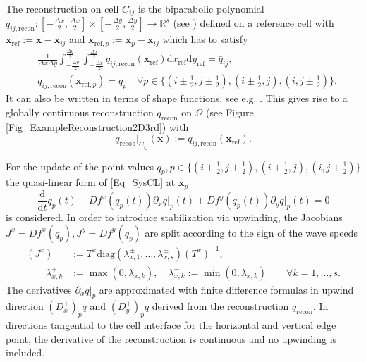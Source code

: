 \documentclass[12pt,a4paper]{article}
\newcommand{\refel}{\mathrm{ref}}
\newcommand{\recon}{\mathrm{recon}}
\begin{document}
The reconstruction on cell \(C_{ij}\) is the biparabolic polynomial \(q_{ij, \mathrm{recon}}: [-\tfrac{\Delta x}{2}, \tfrac{\Delta x}{2}]\times[-\tfrac{\Delta y}{2},\tfrac{\Delta y}{2}] \rightarrow \mathbb R^s\) (see \cite{ABK2025, BHKR2019}) 
defined on a reference cell with \(\mathbf x_\mathrm{ref} := \mathbf x - \mathbf x_{ij}\) and \(\mathbf x_{\mathrm{ref},p} := \mathbf x_p - \mathbf x_{ij}\) which has to satisfy
\begin{align*}
	&\frac{1}{\Delta x \Delta y} \int_{-\frac{\Delta y}{2}}^{\frac{\Delta y}{2}}\int_{-\frac{\Delta x}{2}}^{\frac{\Delta x}{2}} q_{ij, \mathrm{recon}}(\mathbf x_\mathrm{ref}) \mathrm d x_\mathrm{ref} \mathrm d y_\mathrm{ref} = \bar q_{ij},\\
	&q_{ij, \mathrm{recon}}(\mathbf x_{\mathrm{ref},p}) = q_p \quad \forall p \in \{(i \pm \tfrac12, j\pm \tfrac12), (i \pm \tfrac12,j), (i,j \pm \tfrac12)\}.
\end{align*}
It can also be written in terms of shape functions, see e.g. \cite{BKKL2024pre}. This gives rise to a globally continuous reconstruction \(q_\mathrm{recon}\) on \(\Omega\) (see Figure \ref{Fig_ExampleReconstruction2D3rd}) with 
\begin{equation}
	q_\recon|_{C_{ij}}(\mathbf x) := q_{ij, \recon}(\mathbf x_\refel).
\end{equation}



For the update of the point values \(q_p, p \in \{(i+\tfrac{1}{2},j+\tfrac{1}{2}), (i+\tfrac{1}{2},j), (i,j+\tfrac{1}{2})\}\) the quasi-linear form of \eqref{Eq_SysCL} at $\mathbf x_p$
\begin{equation*}
	\frac{\mathrm d}{\mathrm d t}q_p(t)  +  Df^x(q_p(t)) \partial_x q\vert_p(t) +  Df^y(q_p(t)) \partial_y q\vert_p(t)  = 0 
\end{equation*}
is considered.
In order to introduce stabilization via upwinding, the Jacobians \(J^x = Df^x(q_p), J^y = Df^y(q_p) \) are split according to the sign of the wave speeds
\begin{align*}
	(J^x)^{\pm} &:= T^x\mathrm{diag}(\lambda_{x,1}^{\pm},\dots , \lambda_{x,s}^{\pm})(T^x)^{-1},\\
	\qquad \lambda_{x,k}^{+} &:= \max(0, \lambda_{x,k}), \quad \lambda_{x,k}^{-} := \min(0, \lambda_{x,k}) \qquad \forall k = 1, \dots, s. 
\end{align*}
The derivatives \(\partial_x q\vert_p\) are approximated with finite difference formulas in upwind direction \((D_x^{\pm})_p q\) and \((D_y^{\pm})_p q\) derived from the reconstruction \(q_\mathrm{recon}\). 
In directions tangential to the cell interface for the horizontal and vertical edge point, the derivative of the reconstruction is continuous and no upwinding is included. \\
\end{document}
